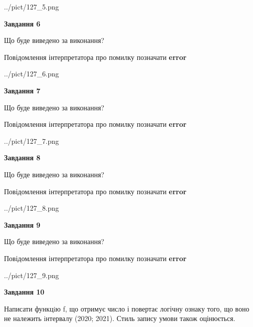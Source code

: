 \documentclass[12pt, ukrainian]{article}
\begin{document}
{\begin {large}
\begin{center}
	{../pict/127_5.png}
\end{center}
\newpage

{\begin {center}\textbf{Завдання 6}\end {center}}\par
Що буде виведено за виконання? \par
Повідомлення інтерпретатора про помилку позначати \textbf{error}

\begin{center}
	{../pict/127_6.png}
\end{center}
\newpage

{\begin {center}\textbf{Завдання 7}\end {center}}\par
Що буде виведено за виконання? \par
Повідомлення інтерпретатора про помилку позначати \textbf{error}

\begin{center}
	{../pict/127_7.png}
\end{center}
\newpage

{\begin {center}\textbf{Завдання 8}\end {center}}\par
Що буде виведено за виконання? \par
Повідомлення інтерпретатора про помилку позначати \textbf{error}

\begin{center}
	{../pict/127_8.png}
\end{center}
\newpage

{\begin {center}\textbf{Завдання 9}\end {center}}\par
Що буде виведено за виконання? \par
Повідомлення інтерпретатора про помилку позначати \textbf{error}

\begin{center}
	{../pict/127_9.png}
\end{center}
\newpage

{\begin {center}\textbf{Завдання 10}\end {center}}\par

Написати функцiю f, що отримує число і повертає логічну ознаку того, що воно не належить iнтервалу (2020; 2021). Стиль запису умови також оцінюється.\par
\newpage

\end {large}}
\end{document}
